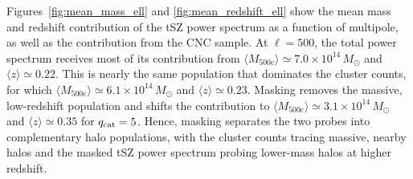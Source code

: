 \documentclass[aps,prd,twocolumn,superscriptaddress,nofootinbib,floatfix]{revtex4-2}
\begin{document}
Figures~\ref{fig:mean_mass_ell} and \ref{fig:mean_redshift_ell} show the mean mass and redshift contribution of the tSZ power spectrum as a function of multipole, as well as the contribution from the CNC sample. At $\ell=500$, the total power spectrum receives most of its contribution from $\langle M_{500\mathrm{c}}\rangle\simeq 7.0\times10^{14}\,M_\odot$ and
$\langle z\rangle\simeq 0.22$. This is nearly the same population that dominates the cluster counts, for which
$\langle M_{500\mathrm{c}}\rangle\simeq 6.1\times10^{14}\,M_\odot$ and
$\langle z\rangle\simeq 0.23$. Masking removes the massive, low-redshift population and shifts the contribution to $\langle M_{500\mathrm{c}}\rangle\simeq 3.1\times10^{14}\,M_\odot$ and
$\langle z\rangle\simeq 0.35$ for $q_{\rm cat}= 5$. Hence, masking separates the two probes into complementary halo populations, with the cluster counts tracing massive, nearby halos and the masked tSZ power spectrum probing lower-mass halos at higher redshift.

\end{document}
